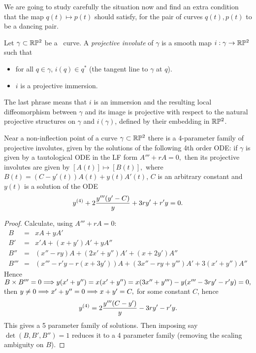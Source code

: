  We are going to study carefully the situation now and find an extra condition that the map $q(t)\mapsto p(t)$ should satisfy, for the pair of curves $q(t), p(t)$ to be  a dancing pair. 



 
\begin{definition}  Let $\gamma\subset\mathbb{R}\mathbb{P}^2$ be a \lc\ curve.   A {\em projective  involute}  of $\gamma$ is a smooth map  $i:\gamma\to \mathbb{R}\mathbb{P}^2$ such that  

\begin{itemize}\item  for all $q\in \gamma$,   $i(q)\in q^*$ (the tangent line to $\gamma$ at $q$). 



\item  $i$ is a projective immersion. 
\end{itemize}
\end{definition}

The last phrase means that $i$ is an immersion and  the resulting  local diffeomorphism between $\gamma$ and its image  is projective with respect to the natural projective structures on $\gamma$ and  $i(\gamma)$, defined by their embedding in $\mathbb{R}\mathbb{P}^2$.





 \begin{proposition} Near a non-inflection point  of a curve $\gamma\subset \mathbb{R}\mathbb{P}^2$ there is a 4-parameter family of
   projective involutes, given by the solutions of the following 4th order ODE:
 if $\gamma$ is given by a tautological ODE in the  LF form $A'''+rA=0,$ then its projective involutes  are  given  by $[A(t) ]\mapsto [B(t) ], $ where  $B(t) =(C-y'(t) )A(t) +y(t) A'(t) $, 
$C$ is an  arbitrary  constant and  $y(t) $ is a solution of  the  ODE 
      $$y^{(4)}+2{y'''(y'-C)\over y}+3ry'+r'y=0.$$
          \end{proposition}

 \begin{proof}  Calculate, using $A'''+rA=0$: 
 \begin{eqnarray*} 
B&=&xA+ yA'\\
B'&=&x'A+ (x+y')A' + yA''\\
B''&=&(x''-ry)A+ (2x'+y'')A'+ (x+2y')A''\\
B'''&=&(x'''-r'y-r(x+3y'))A+ (3x''-ry+y''')A'+ 3(x'+y'')A''
 \end{eqnarray*}
Hence $B\times B'''=0\Longrightarrow y(x'+y'')=x(x'+y'')=x(3x''+y''')-y(x'''-3ry'-r'y)=0,$ then $y\neq 0\Longrightarrow x'+y''=0\Longrightarrow x+y'=C, $ for some constant $C$, hence  
 $$y^{(4)}= 2{y'''(C-y')\over y}-3ry'-r'y.$$
This gives a 5 parameter family of solutions. Then imposing say $\det(B,B',B'')=1$ reduces it to a 4 parameter family (removing the scaling ambiguity on $B$). \end{proof}



